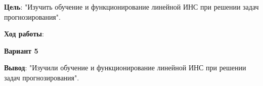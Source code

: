 \textbf{Цель}: "Изучить обучение и функционирование линейной ИНС при решении задач прогнозирования".

\begin{center}
    \textbf{Ход работы}:
\end{center}

\begin{center}
    \textbf{Вариант 5}
\end{center}



\newpage



\textbf{Вывод}: "Изучили обучение и функционирование линейной ИНС при решении задач прогнозирования".